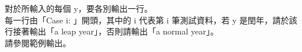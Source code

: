 對於所輸入的每個 y，要各別輸出一行。\\
每一行由「Case i: 」開頭，其中的 i 代表第 i 筆測試資料，若 y 是閏年，請於該行接著輸出「a leap year」，否則請輸出「a normal year」。\\
請參閱範例輸出。\\
